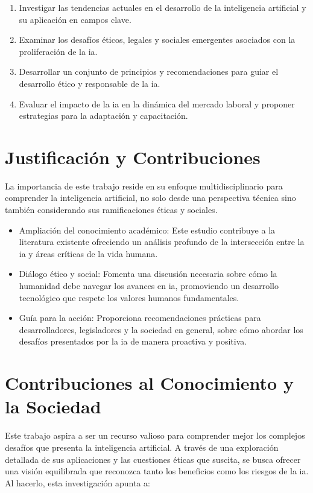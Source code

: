 \begin{enumerate}
    \item Investigar las tendencias actuales en el desarrollo de la inteligencia artificial y su aplicación en campos clave.
    \item Examinar los desafíos éticos, legales y sociales emergentes asociados con la proliferación de la \acrshort{ia}.
    \item Desarrollar un conjunto de principios y recomendaciones para guiar el desarrollo ético y responsable de la \acrshort{ia}.
    \item Evaluar el impacto de la \acrshort{ia} en la dinámica del mercado laboral y proponer estrategias para la adaptación y capacitación.
\end{enumerate}

\section{Justificación y Contribuciones}

La importancia de este trabajo reside en su enfoque multidisciplinario para comprender la inteligencia artificial, no solo desde una perspectiva técnica sino también considerando sus ramificaciones éticas y sociales.

\begin{itemize}
    \item Ampliación del conocimiento académico: Este estudio contribuye a la literatura existente ofreciendo un análisis profundo de la intersección entre la \acrshort{ia} y áreas críticas de la vida humana.
    \item Diálogo ético y social: Fomenta una discusión necesaria sobre cómo la humanidad debe navegar los avances en \acrshort{ia}, promoviendo un desarrollo tecnológico que respete los valores humanos fundamentales.
    \item Guía para la acción: Proporciona recomendaciones prácticas para desarrolladores, legisladores y la sociedad en general, sobre cómo abordar los desafíos presentados por la \acrshort{ia} de manera proactiva y positiva.
\end{itemize}

\section{Contribuciones al Conocimiento y la Sociedad}

Este trabajo aspira a ser un recurso valioso para comprender mejor los complejos desafíos que presenta la inteligencia artificial. A través de una exploración detallada de sus aplicaciones y las cuestiones éticas que suscita, se busca ofrecer una visión equilibrada que reconozca tanto los beneficios como los riesgos de la \acrshort{ia}. Al hacerlo, esta investigación apunta a:

